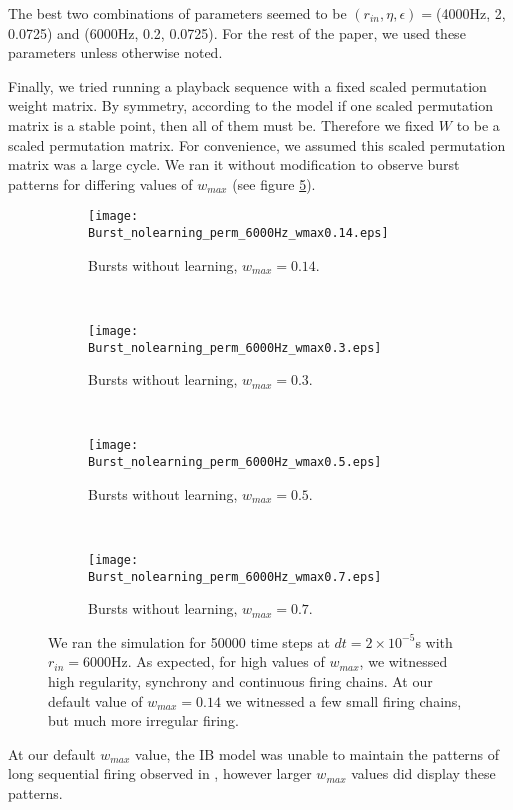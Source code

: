 The best two combinations of parameters seemed to be \((r_{in},\eta,\epsilon) = \)(4000Hz, 2, 0.0725) and (6000Hz, 0.2, 0.0725). For the rest of the paper, we used these parameters unless otherwise noted.

Finally, we tried running a playback sequence with a fixed scaled permutation weight matrix. By symmetry, according to the model if one scaled permutation matrix is a stable point, then all of them must be. Therefore we fixed \(W\) to be a scaled permutation matrix. For convenience, we assumed this scaled permutation matrix was a large cycle. We ran it without modification to observe burst patterns for differing values of \(w_{max}\) (see figure \ref{Burst_no_learning}).

\begin{figure}[H]
\centering
\begin{subfigure}[b]{0.49\textwidth}
\texttt{[image: Burst\_nolearning\_perm\_6000Hz\_wmax0.14.eps]}
\caption{Bursts without learning, \(w_{max} = 0.14\).}
\label{Burst_no_learning: 0.14}
\end{subfigure}
\,
\begin{subfigure}[b]{0.49\textwidth}
\texttt{[image: Burst\_nolearning\_perm\_6000Hz\_wmax0.3.eps]}
\caption{Bursts without learning, \(w_{max} = 0.3\).}
\label{Burst_no_learning: 0.3}
\end{subfigure}
\\
\begin{subfigure}[b]{0.49\textwidth}
\texttt{[image: Burst\_nolearning\_perm\_6000Hz\_wmax0.5.eps]}
\caption{Bursts without learning, \(w_{max} = 0.5\).}
\label{Burst_no_learning: 0.5}
\end{subfigure}
\,
\begin{subfigure}[b]{0.49\textwidth}
\texttt{[image: Burst\_nolearning\_perm\_6000Hz\_wmax0.7.eps]}
\caption{Bursts without learning, \(w_{max} = 0.7\).}
\label{Burst_no_learning: 0.7}
\end{subfigure}
\caption{We ran the simulation for 50000 time steps at \(dt = 2\times 10^{-5}\)s with \(r_{in} = 6000\)Hz. As expected, for high values of \(w_{max}\), we witnessed high regularity, synchrony and continuous firing chains. At our default value of \(w_{max} = 0.14\) we witnessed a few small firing chains, but much more irregular firing.}
\label{Burst_no_learning}
\end{figure}

At our default \(w_{max}\) value, the IB model was unable to maintain the patterns of long sequential firing observed in \cite{Fiete}, however larger \(w_{max}\) values did display these patterns.

